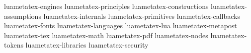 \startbodymatter
    \component luametatex-engines
    \component luametatex-principles
    \component luametatex-constructions
    \component luametatex-assumptions
    \component luametatex-internals
    \component luametatex-primitives
    \component luametatex-callbacks
    \component luametatex-fonts
    \component luametatex-languages
    \component luametatex-lua
    \component luametatex-metapost
    \component luametatex-tex
    \component luametatex-math
    \component luametatex-pdf
    \component luametatex-nodes
    \component luametatex-tokens
    \component luametatex-libraries
    \component luametatex-security
\stopbodymatter

\stopdocument

